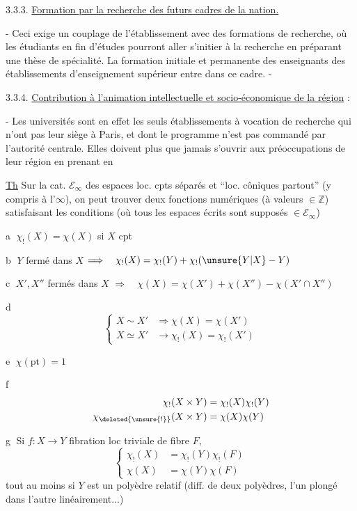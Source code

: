 3.3.3. \uline{Formation par la recherche des futurs cadres de la nation.}

- Ceci exige un couplage de l'établissement avec des formations de recherche, où les étudiants en fin d'études pourront aller s'initier à la recherche en préparant une thèse de spécialité. La formation initiale et permanente des enseignants des établissements d'enseignement supérieur entre dans ce cadre. -

3.3.4. \uline{Contribution à l'animation intellectuelle et socio-économique de la région} :

- Les universités sont en effet les seuls établissements à vocation de recherche qui n'ont pas leur siège à Paris, et dont le programme n'est pas commandé par l'autorité centrale. Elles doivent plus que jamais s'ouvrir aux préoccupations de leur région en prenant en


\uline{Th} Sur la cat. $\mathcal E_\infty$ des espaces loc. cpts séparés et  ``loc. côniques partout'' (y compris à l'$\infty$), on peut trouver deux fonctions numériques \inserted{$\chi_!,\chi$} (à valeurs $\in\mathbb Z$) satisfaisant les conditions (où tous les espaces écrits sont supposés $\in\mathcal E_\infty$)

\textcircled{a} $\chi_!(X)=\chi(X)$ si $X$ cpt

\textcircled{b} $Y$ fermé dans $X$ $\Longrightarrow\quad\chi_!(X)=\chi_!(Y)+\chi_!(\unsure{Y|X}-Y)$

\textcircled{c} $X',X''$ fermés dans $X$ $\Longrightarrow\quad\chi(X)=\chi(X')+\chi(X'')-\chi(X'\cap X'')$

\textcircled{d}
\[
\left\{\begin{aligned}
X\sim X'&\Longrightarrow\chi(X)=\chi(X')\\
X\simeq X'&\longrightarrow\chi_!(X)=\chi_!(X')
\end{aligned}\right.
\]

\textcircled{e} $\chi(\mathrm{pt})=1$

\textcircled{f}
\[
\begin{aligned}
\chi_!(X\times Y)&=\chi_!(X)\chi_!(Y)\\
\chi_{\deleted{\unsure{!}}}(X\times Y)&=\chi(X)\chi(Y)
\end{aligned}
\]

\textcircled{g} Si $f:X\longrightarrow Y$ fibration loc triviale de fibre $F$,
\[
\left\{\begin{aligned}
\chi_!(X)&=\chi_!(Y)\chi_!(F)\\
\chi(X)&=\chi(Y)\chi(F)
\end{aligned}\right.
\]
tout au moins si $Y$ est un polyèdre relatif (diff. de deux polyèdres, l'un plongé dans l'autre linéairement...)


